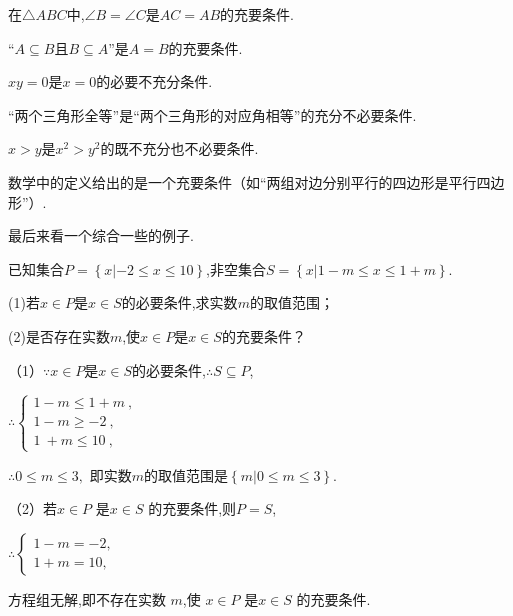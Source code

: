 \documentclass[lang=cn,math=cm,chinesefont=nofont,11pt,scheme=chinese,twocol]{elegantbook}
\begin{document}
\begin{example}
  在$\triangle ABC$中,$\angle B=\angle C$是$AC=AB$的充要条件.
\end{example}

\begin{example}
  “$A\subseteq B$且$B\subseteq A”$是$A=B$的充要条件.
\end{example}

\begin{example}
  $xy=0$是$x=0$的必要不充分条件.
\end{example}

\begin{example}
  “两个三角形全等”是“两个三角形的对应角相等”的充分不必要条件.
\end{example}

\begin{example}
  $x>y$是$x^2>y^2$的既不充分也不必要条件.
\end{example}

\begin{example}
  数学中的定义给出的是一个充要条件（如“两组对边分别平行的四边形是平行四边形”）.
\end{example}

\hspace*{\fill}

最后来看一个综合一些的例子.

\begin{example}\label{2022BST_Math_BX1_RJA_P18.20}
  已知集合$P=\left\{x|-2\leq x\leqslant10\right\}$,非空集合$S=\left\{x|1-m\leqslant x\leqslant1+m\right\}.$

  (1)若$x\in P$是$x\in S$的必要条件,求实数$m$的取值范围；

  (2)是否存在实数$m$,使$x\in P$是$x\in S$的充要条件？
\end{example}

\begin{solution}
  （1）$\because x\in P$是$x\in S$的必要条件,$\therefore S\subseteq P$,

  $\therefore\begin{cases}1-m\leqslant1+m\:,\\1-m\geqslant-2\:,\\1\:+m\leqslant10\:,\end{cases}$
  
  $\therefore 0\leqslant m\leqslant 3,$
  即实数$m$的取值范围是$\left\{m|0\leqslant m\leqslant3\right\}.$

  （2）若$x\in P$ 是$x\in S$ 的充要条件,则$P=S$,

  $\therefore\begin{cases}1-m=-2,\\1+m=10,\end{cases}$
  
  方程组无解,即不存在实数 $m$,使 $x\in P$ 是$x\in S$ 的充要条件.
\end{solution}
\end{document}
